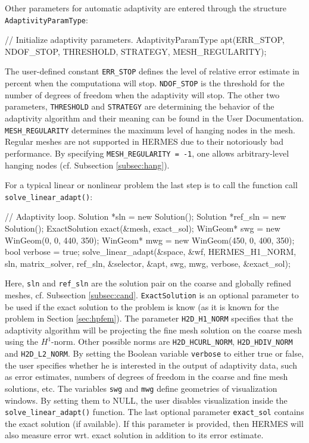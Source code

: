 \documentclass[final,3p,times,twocolumn]{elsarticle}
\begin{document}
Other parameters for automatic adaptivity are entered through the 
structure {\tt AdaptivityParamType}:

\begin{code}
  // Initialize adaptivity parameters.
  AdaptivityParamType apt(ERR_STOP, NDOF_STOP, 
                          THRESHOLD, STRATEGY, 
                          MESH_REGULARITY);
\end{code}
The user-defined constant {\tt ERR\_STOP} defines the level of 
relative error estimate in percent when the computationa will stop. 
{\tt NDOF\_STOP} is the threshold for the number of degrees of freedom 
when the adaptivity will stop. The other two parameters, {\tt THRESHOLD}
and {\tt STRATEGY} are determining the behavior of the adaptivity 
algorithm and their meaning can be found in the User Documentation.
{\tt MESH\_REGULARITY} determines the maximum level of hanging nodes
in the mesh. Regular meshes are not supported in HERMES due to their 
notoriously bad performance. By specifying {\tt MESH\_REGULARITY = -1},
one allows arbitrary-level hanging nodes (cf. Subsection 
\ref{subsec:hang}).

For a typical linear or nonlinear problem the last step is to call the 
function call {\tt solve\_linear\_adapt()}:

\begin{code}
  // Adaptivity loop.
  Solution *sln = new Solution();
  Solution *ref_sln = new Solution();
  ExactSolution exact(&mesh, exact_sol);
  WinGeom* swg = new WinGeom(0, 0, 440, 350);
  WinGeom* mwg = new WinGeom(450, 0, 400, 350);
  bool verbose = true;    
  solve_linear_adapt(&space, &wf, HERMES_H1_NORM, sln, 
                     matrix_solver, ref_sln, 
                     &selector, &apt, swg, mwg, 
                     verbose, &exact_sol);
\end{code}
Here, {\tt sln} and {\tt ref\_sln} are the 
solution pair on the coarse and globally refined 
meshes, cf. Subsection \ref{subsec:cand}.
{\tt ExactSolution} is an optional parameter to be used
if the exact solution to the problem is know (as
it is known for the problem in Section \ref{sec:hpfem}).
The parameter {\tt H2D\_H1\_NORM} specifies that the
adaptivity algorithm will be projecting the fine mesh
solution on the coarse mesh using the $H^1$-norm. 
Other possible norms are {\tt H2D\_HCURL\_NORM},
{\tt H2D\_HDIV\_NORM} and {\tt H2D\_L2\_NORM}.
By setting the Boolean variable {\tt verbose} to either 
true or false, the user specifies whether he is 
interested in the output of adaptivity data, such as 
error estimates, numbers of degrees of freedom in the 
coarse and fine mesh solutions, etc. The variables
{\tt swg} and {\tt mwg} define geometries of 
visualization windows. By setting them to NULL, the
user disables visualization inside the {\tt solve\_linear\_adapt()}
function. The last optional parameter {\tt exact\_sol}
contains the exact solution (if available). If this 
parameter is provided, then HERMES will also measure
error wrt. exact solution in addition to its error
estimate. 
\end{document}
